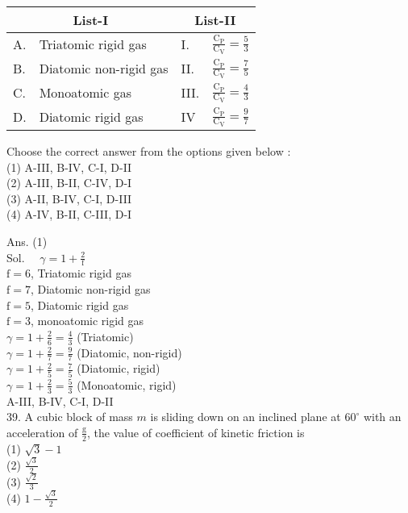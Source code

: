 \documentclass[10pt]{article}
\begin{document}
\begin{center}
\begin{tabular}{|l|l|l|l|}
\hline
\multicolumn{2}{|c|}{List-I} & \multicolumn{2}{|c|}{List-II} \\
\hline
A. & Triatomic rigid gas & I. & \(\frac{\mathrm{C}_{\mathrm{P}}}{\mathrm{C}_{\mathrm{V}}}=\frac{5}{3}\) \\
\hline
B. & Diatomic non-rigid gas & II. & \(\frac{\mathrm{C}_{\mathrm{P}}}{\mathrm{C}_{\mathrm{V}}}=\frac{7}{5}\) \\
\hline
C. & Monoatomic gas & III. & \(\frac{\mathrm{C}_{\mathrm{P}}}{\mathrm{C}_{\mathrm{V}}}=\frac{4}{3}\) \\
\hline
D. & Diatomic rigid gas & IV & \(\frac{\mathrm{C}_{\mathrm{P}}}{\mathrm{C}_{\mathrm{V}}}=\frac{9}{7}\) \\
\hline
\end{tabular}
\end{center}

Choose the correct answer from the options given below :\\
(1) A-III, B-IV, C-I, D-II\\
(2) A-III, B-II, C-IV, D-I\\
(3) A-II, B-IV, C-I, D-III\\
(4) A-IV, B-II, C-III, D-I

Ans. (1)\\
Sol. \(\quad \gamma=1+\frac{2}{\mathrm{f}}\)\\
\(\mathrm{f}=6\), Triatomic rigid gas\\
\(\mathrm{f}=7\), Diatomic non-rigid gas\\
\(\mathrm{f}=5\), Diatomic rigid gas\\
\(\mathrm{f}=3\), monoatomic rigid gas\\
\(\gamma=1+\frac{2}{6}=\frac{4}{3}\) (Triatomic)\\
\(\gamma=1+\frac{2}{7}=\frac{9}{7}\) (Diatomic, non-rigid)\\
\(\gamma=1+\frac{2}{5}=\frac{7}{5}\) (Diatomic, rigid)\\
\(\gamma=1+\frac{2}{3}=\frac{5}{3}\) (Monoatomic, rigid)\\
A-III, B-IV, C-I, D-II\\
39. A cubic block of mass \(m\) is sliding down on an inclined plane at \(60^{\circ}\) with an acceleration of \(\frac{\mathrm{g}}{2}\), the value of coefficient of kinetic friction is\\
(1) \(\sqrt{3}-1\)\\
(2) \(\frac{\sqrt{3}}{2}\)\\
(3) \(\frac{\sqrt{2}}{3}\)\\
(4) \(1-\frac{\sqrt{3}}{2}\)
\end{document}
